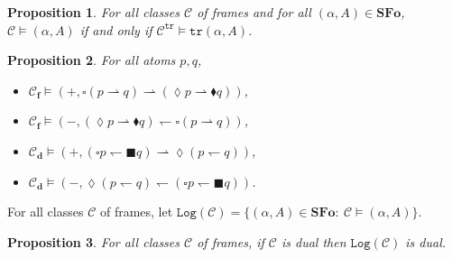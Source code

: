 \documentclass[draft]{article}
\newtheorem{proposition}{Proposition}
\newenvironment{proof}{{\bf Proof:}}{~$\dashv$\\}
\def\SFo{\mathbf{SFo}}
\def\fcfra{\mathbf{f}}
\def\dcfra{\mathbf{d}}
\def\Log{\mathtt{Log}}
\begin{document}
%
%
\begin{proposition}\label{Proposition:about:duality:complement:valuation:transpose:formulas:validity:class:of:frames:bis}
%
%
For all classes ${\mathcal C}$ of frames and for all $(\alpha,A){\in}\SFo$, ${\mathcal C}{\models}(\alpha,A)$ if and only if ${\mathcal C}^{\mathtt{tr}}{\models}\mathtt{tr}(\alpha,A)$.
%
%
\end{proposition}
%
%
%
%
%
%
%
%
\begin{proposition}\label{about:sat:formulas:forward:downward:frames}
%
%
For all atoms $p,q$,
%
%
\begin{itemize}
%
%
\item ${\mathcal C}_{\fcfra}{\models}(+,{\square}(p{\rightharpoonup}q){\rightharpoonup}({\lozenge}p{\rightharpoonup}{\blacklozenge}q))$,
%
%
\item ${\mathcal C}_{\fcfra}{\models}(-,({\lozenge}p{\rightharpoonup}{\blacklozenge}q){\leftharpoondown}{\square}(p{\rightharpoonup}q))$,
%
%
\item ${\mathcal C}_{\dcfra}{\models}(+,({\square}p{\leftharpoondown}{\blacksquare}q){\rightharpoonup}{\lozenge}(p{\leftharpoondown}q))$,
%
%
\item ${\mathcal C}_{\dcfra}{\models}(-,{\lozenge}(p{\leftharpoondown}q){\leftharpoondown}({\square}p{\leftharpoondown}{\blacksquare}q))$.
%
%
\end{itemize}
%
%
\end{proposition}
%
%
%
%
For all classes ${\mathcal C}$ of frames, let $\Log({\mathcal C}){=}\{(\alpha,A){\in}\SFo:\ {\mathcal C}{\models}(\alpha,A)\}$.
%
%
\begin{proposition}
%
%
For all classes ${\mathcal C}$ of frames, if ${\mathcal C}$ is dual then $\Log({\mathcal C})$ is dual.
%
%
\end{proposition}
%
%
%
%
%
%
%
%
\end{document}
